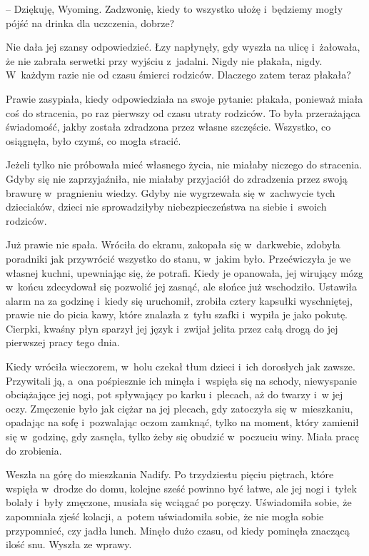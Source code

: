 \documentclass[oneside,polish,11pt,sfheadings]{mwbk}
\begin{document}
-- Dziękuję, Wyoming. Zadzwonię, kiedy to wszystko ułożę i~będziemy mogły pójść na drinka dla uczczenia, dobrze?

Nie dała jej szansy odpowiedzieć. Łzy napłynęły, gdy wyszła na ulicę i~żałowała, że nie zabrała serwetki przy wyjściu z~jadalni. Nigdy nie
płakała, nigdy. W~każdym razie nie od czasu śmierci rodziców. Dlaczego
zatem teraz płakała?

Prawie zasypiała, kiedy odpowiedziała na swoje pytanie: płakała,
ponieważ miała coś do stracenia, po raz pierwszy od czasu utraty
rodziców. To była przerażająca świadomość, jakby została zdradzona przez
własne szczęście. Wszystko, co osiągnęła, było czymś, co mogła stracić.

Jeżeli tylko nie próbowała mieć własnego życia, nie miałaby niczego do
stracenia. Gdyby się nie zaprzyjaźniła, nie miałaby przyjaciół do
zdradzenia przez swoją brawurę w~pragnieniu wiedzy. Gdyby nie wygrzewała
się w~zachwycie tych dzieciaków, dzieci nie sprowadziłyby
niebezpieczeństwa na siebie i~swoich rodziców.

Już prawie nie spała. Wróciła do ekranu, zakopała się w~darkwebie,
zdobyła poradniki jak przywrócić wszystko do stanu, w~jakim było.
Przećwiczyła je we własnej kuchni, upewniając się, że potrafi. Kiedy je
opanowała, jej wirujący mózg w~końcu zdecydował się pozwolić jej zasnąć,
ale słońce już wschodziło. Ustawiła alarm na za godzinę i~kiedy się
uruchomił, zrobiła cztery kapsułki wyschniętej, prawie nie do picia
kawy, które znalazła z~tyłu szafki i~wypiła je jako pokutę. Cierpki,
kwaśny płyn sparzył jej język i~zwijał jelita przez całą drogą do jej
pierwszej pracy tego dnia.

Kiedy wróciła wieczorem, w~holu czekał tłum dzieci i~ich dorosłych jak
zawsze. Przywitali ją, a~ona pośpiesznie ich minęła i~wspięła się na
schody, niewyspanie obciążające jej nogi, pot spływający po karku i~plecach, aż do twarzy i~w jej oczy. Zmęczenie było jak ciężar na jej
plecach, gdy zatoczyła się w~mieszkaniu, opadając na sofę i~pozwalając
oczom zamknąć, tylko na moment, który zamienił się w~godzinę, gdy
zasnęła, tylko żeby się obudzić w~poczuciu winy. Miała pracę do
zrobienia.

Weszła na górę do mieszkania Nadify. Po trzydziestu pięciu piętrach,
które wspięła w~drodze do domu, kolejne sześć powinno być łatwe, ale jej
nogi i~tyłek bolały i~były zmęczone, musiała się wciągać po poręczy.
Uświadomiła sobie, że zapomniała zjeść kolacji, a~potem uświadomiła
sobie, że nie mogła sobie przypomnieć, czy jadła lunch. Minęło dużo
czasu, od kiedy pominęła znaczącą ilość snu. Wyszła ze wprawy.
\end{document}
